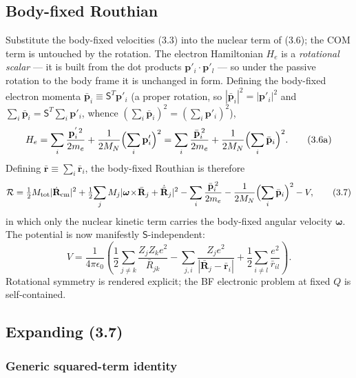 \subsection{Body-fixed Routhian}

Substitute the body-fixed velocities (3.3) into the nuclear term of (3.6); the COM term is untouched by the rotation. The electron Hamiltonian $H_e$ is a \emph{rotational scalar} --- it is built from the dot products $\mathbf{p}'_i\!\cdot\!\mathbf{p}'_l$ --- so under the passive rotation to the body frame it is unchanged in form. Defining the body-fixed electron momenta $\bar{\mathbf{p}}_i\equiv\mathsf{S}^{T}\mathbf{p}'_i$ (a proper rotation, so $|\bar{\mathbf{p}}_i|^2=|\mathbf{p}'_i|^2$ and $\sum_i\bar{\mathbf{p}}_i=\mathsf{S}^{T}\sum_i\mathbf{p}'_i$, whence $(\sum_i\bar{\mathbf{p}}_i)^2=(\sum_i\mathbf{p}'_i)^2$),
\begin{equation}
H_e=\sum_i\frac{\mathbf{p}_i^{'\,2}}{2m_e}+\frac{1}{2M_N}\Bigl(\sum_i\mathbf{p}'_i\Bigr)^{2}=\sum_i\frac{\bar{\mathbf{p}}_i^{\,2}}{2m_e}+\frac{1}{2M_N}\Bigl(\sum_i\bar{\mathbf{p}}_i\Bigr)^{2}. \tag{3.6a}
\end{equation}
Defining $\bar{\mathbf{r}}\equiv\sum_i\bar{\mathbf{r}}_i$, the body-fixed Routhian is therefore
\begin{equation}
\mathcal{R}=\tfrac12 M_{\mathrm{tot}}|\dot{\mathbf{R}}_{\mathrm{cm}}|^2+\tfrac12\!\sum_j M_j|\boldsymbol{\omega}\!\times\!\bar{\mathbf{R}}_j+\dot{\bar{\mathbf{R}}}_j|^2-\sum_i\frac{\bar{\mathbf{p}}_i^{\,2}}{2m_e}-\frac{1}{2M_N}\Bigl(\sum_i\bar{\mathbf{p}}_i\Bigr)^{2}-V, \tag{3.7}
\end{equation}
in which only the nuclear kinetic term carries the body-fixed angular velocity $\boldsymbol{\omega}$. The potential is now manifestly $\mathsf{S}$-independent:
\begin{equation}
V=\frac{1}{4\pi\epsilon_0}\left(\frac{1}{2}\!\sum_{j\ne k}\!\frac{Z_jZ_ke^2}{\bar R_{jk}}-\!\sum_{j,i}\!\frac{Z_je^2}{|\bar{\mathbf{R}}_j-\bar{\mathbf{r}}_i|}+\frac{1}{2}\!\sum_{i\ne l}\!\frac{e^2}{\bar{r}_{il}}\right). \tag{3.8}
\end{equation}
Rotational symmetry is rendered explicit; the BF electronic problem at fixed $Q$ is self-contained.

\subsection{Expanding (3.7)}

\subsubsection{Generic squared-term identity}

